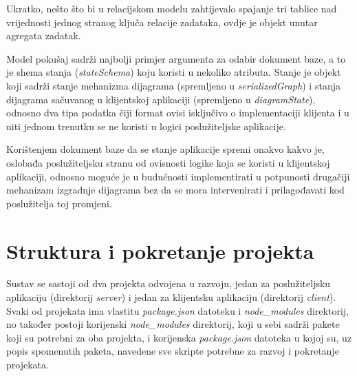 \documentclass[times, utf8, diplomski, numeric]{fer}
\newcommand{\razmakp}{\vspace{18pt}}
\begin{document}
Ukratko, nešto što bi u relacijskom modelu zahtijevalo spajanje tri tablice nad vrijednosti jednog stranog ključa relacije zadataka, ovdje je objekt unutar agregata zadatak.

\razmakp

Model pokušaj sadrži najbolji primjer argumenta za odabir dokument baze, a to je shema stanja (\emph{stateSchema}) koju koristi u nekoliko atributa.
Stanje je objekt koji sadrži stanje mehanizma dijagrama (spremljeno u \emph{serializedGraph}) i stanja dijagrama sačuvanog u klijentskoj aplikaciji (spremljeno u \emph{diagramState}), odnosno dva tipa podatka čiji format ovisi isključivo o implementaciji klijenta i u niti jednom trenutku se ne koristi u logici poslužiteljske aplikacije.

Korištenjem dokument baze da se stanje aplikacije spremi onakvo kakvo je, oslobađa poslužiteljsku stranu od ovisnosti logike koja se koristi u klijentskoj aplikaciji, odnosno moguće je u budućnosti implementirati u potpunosti drugačiji mehanizam izgradnje dijagrama bez da se mora intervenirati i prilagođavati kod poslužitelja toj promjeni.


\razmakp
\razmakp
\section{Struktura i pokretanje projekta}

Sustav se sastoji od dva projekta odvojena u razvoju, jedan za poslužiteljsku aplikaciju (direktorij \emph{server}) i jedan za klijentsku aplikaciju (direktorij \emph{client}).
Svaki od projekata ima vlastitu \emph{package.json} datoteku i \emph{node\_modules} direktorij, no također postoji korijenski  \emph{node\_modules} direktorij, koji u sebi sadrži pakete koji su potrebni za oba projekta, i korijenska \emph{package.json} datoteka u kojoj su, uz popis spomenutih paketa, navedene sve skripte potrebne za razvoj i pokretanje projekata.
\end{document}

